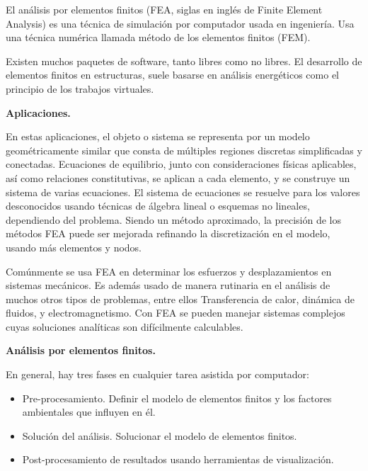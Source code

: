 \documentclass[a4paper,10pt]{article}
\begin{document}
\hfill

El análisis por elementos finitos (FEA, siglas en inglés de Finite Element Analysis) es una técnica de simulación por computador usada en ingeniería. Usa una técnica numérica llamada método de los elementos finitos (FEM).

Existen muchos paquetes de software, tanto libres como no libres. El desarrollo de elementos finitos en estructuras, suele basarse en análisis energéticos como el principio de los trabajos virtuales.

\hfill

\textbf{Aplicaciones.}

\hfill

En estas aplicaciones, el objeto o sistema se representa por un modelo geométricamente similar que consta de múltiples regiones discretas simplificadas y conectadas. Ecuaciones de equilibrio, junto con consideraciones físicas aplicables, así como relaciones constitutivas, se aplican a cada elemento, y se construye un sistema de varias ecuaciones. El sistema de ecuaciones se resuelve para los valores desconocidos usando técnicas de álgebra lineal o esquemas no lineales, dependiendo del problema. Siendo un método aproximado, la precisión de los métodos FEA puede ser mejorada refinando la discretización en el modelo, usando más elementos y nodos.

Comúnmente se usa FEA en determinar los esfuerzos y desplazamientos en sistemas mecánicos. Es además usado de manera rutinaria en el análisis de muchos otros tipos de problemas, entre ellos Transferencia de calor, dinámica de fluidos, y electromagnetismo. Con FEA se pueden manejar sistemas complejos cuyas soluciones analíticas son difícilmente calculables.

\hfill

\textbf{Análisis por elementos finitos.}

\hfill

En general, hay tres fases en cualquier tarea asistida por computador:

\begin{itemize}
 \item Pre-procesamiento. Definir el modelo de elementos finitos y los factores ambientales que influyen en él.
 \item Solución del análisis. Solucionar el modelo de elementos finitos.
 \item Post-procesamiento de resultados usando herramientas de visualización.
\end{itemize}
\end{document}
